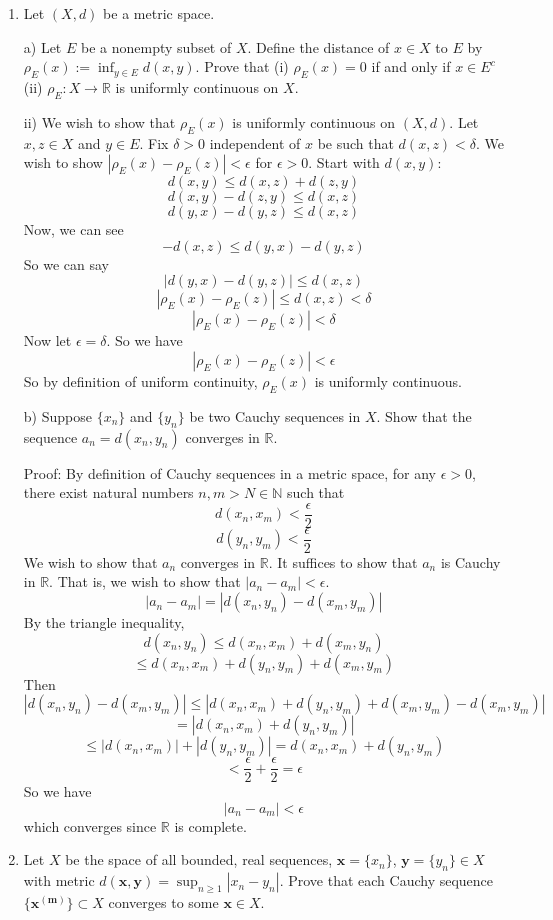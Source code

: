 \documentclass{article}
\begin{document}
\begin{enumerate}
    
    
    
    
    \item Let $(X,d)$ be a metric space.
    
    a) Let $E$ be a nonempty subset of $X$. Define the distance of $x \in X$ to $E$ by $\rho_E(x) := \inf_{y \in E}d(x,y)$. Prove that (i) $\rho_E(x) = 0$ if and only if $x \in E^c$ (ii) $\rho_E : X \to \mathbb{R}$ is uniformly continuous on $X$.
    
    
    ii) We wish to show that $\rho_E(x)$ is uniformly continuous on $(X,d)$. Let $x,z \in X$ and $y \in E$. Fix $\delta > 0$ independent of $x$ be such that $d(x,z) < \delta$. We wish to show $|\rho_E(x) - \rho_E(z)| < \epsilon$ for $\epsilon > 0$. 
    Start with $d(x,y)$:
    \[d(x,y) \leq d(x,z) + d(z,y)\]
    \[d(x,y) - d(z,y) \leq d(x,z)\]
    \[d(y,x) - d(y,z) \leq d(x,z)\]
    Now, we can see
    \[-d(x,z) \leq d(y,x) - d(y,z)\]
    So we can say
    \[|d(y,x) - d(y,z)| \leq d(x,z)\]
    \[|\rho_E(x) - \rho_E(z)| \leq d(x,z) < \delta\]
    \[|\rho_E(x) - \rho_E(z)| < \delta\]
    Now let $\epsilon = \delta$. So we have
    \[|\rho_E(x) - \rho_E(z)| < \epsilon\]
    So by definition of uniform continuity, $\rho_E(x)$ is uniformly continuous.
    
    b) Suppose $\{x_n\}$ and $\{y_n\}$ be two Cauchy sequences in $X$. Show that the sequence $a_n = d(x_n, y_n)$ converges in $\mathbb{R}$.
    
    Proof: By definition of Cauchy sequences in a metric space, for any $\epsilon > 0$, there exist natural numbers $n,m > N\in \mathbb{N}$ such that 
    \[d(x_n, x_m) < \frac{\epsilon}{2}\]
    \[d(y_n, y_m) < \frac{\epsilon}{2}\]
    We wish to show that $a_n$ converges in $\mathbb{R}$. It suffices to show that $a_n$ is Cauchy in $\mathbb{R}$. That is, we wish to show that $|a_n - a_m| < \epsilon$.
    \[|a_n - a_m| = |d(x_n, y_n) - d(x_m, y_m)|\]
    By the triangle inequality,
    \[d(x_n, y_n) \leq d(x_n, x_m) + d(x_m, y_n)\]
    \[\leq d(x_n, x_m) + d(y_n, y_m) + d(x_m, y_m)\]
    Then 
    \[|d(x_n, y_n) - d(x_m, y_m)| \leq |d(x_n, x_m) + d(y_n, y_m) + d(x_m, y_m) - d(x_m, y_m)|\]
    \[ = |d(x_n, x_m) + d(y_n, y_m)|\]
    \[\leq |d(x_n, x_m)| + |d(y_n, y_m)| = d(x_n, x_m) + d(y_n, y_m)\]
    \[ < \frac{\epsilon}{2} + \frac{\epsilon}{2} = \epsilon\]
    So we have 
    \[|a_n - a_m| < \epsilon\]
    which converges since $\mathbb{R}$ is complete. 
    
    
    \item Let $X$ be the space of all bounded, real sequences, $\mathbf{x} = \{x_n\}$, $\mathbf{y} = \{y_n\} \in X$ with metric $d(\mathbf{x}, \mathbf{y}) = \sup_{n \geq 1}|x_n - y_n|$. Prove that each Cauchy sequence $\{\mathbf{x^{(m)}}\} \subset X$ converges to some $\mathbf{x} \in X$.
    

\end{enumerate}
\end{document}
